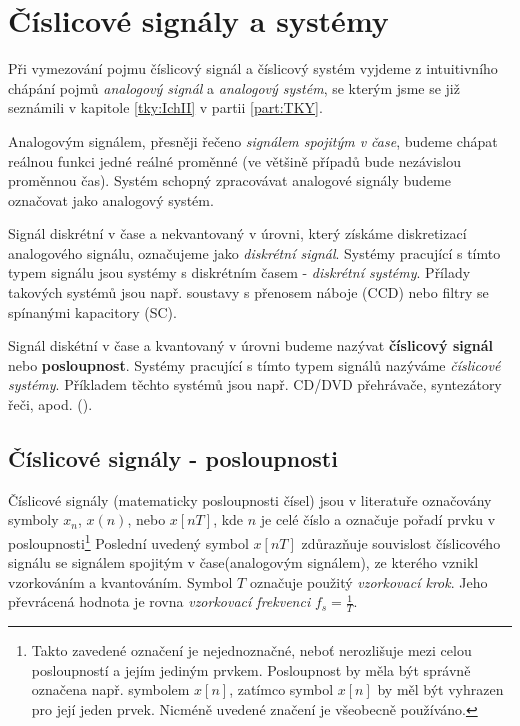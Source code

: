 \setchaptertoc
\chapter{Číslicové signály a systémy}\label{ces:IchapI}
    Při vymezování pojmu číslicový signál a číslicový systém vyjdeme z intuitivního chápání pojmů
    \emph{analogový signál} a \emph{analogový systém}, se kterým jsme se již seznámili v kapitole
    \ref{tky:IchII} v partii \ref{part:TKY}. 
    
    Analogovým signálem, přesněji řečeno \emph{signálem spojitým v čase}, budeme chápat reálnou
    funkci jedné reálné proměnné (ve většině případů bude nezávislou proměnnou čas). Systém schopný
    zpracovávat analogové signály budeme označovat jako analogový systém.

    Signál diskrétní v čase a nekvantovaný v úrovni, který získáme diskretizací analogového signálu,
    označujeme jako \emph{diskrétní signál}. Systémy pracující s tímto typem signálu jsou systémy s
    diskrétním časem - \emph{diskrétní systémy}. Přílady takových systémů jsou např. soustavy s
    přenosem náboje (CCD) nebo filtry se spínanými kapacitory (SC).

    Signál diskétní v čase a kvantovaný v úrovni budeme nazývat \textbf{číslicový signál} nebo
    \textbf{posloupnost}. Systémy pracující s tímto typem signálů nazýváme \emph{číslicové systémy}.
    Příkladem těchto systémů jsou např. CD/DVD přehrávače, syntezátory řeči, apod.
    (\cite[s.~1]{Davidek1996}).
    
  \section{Číslicové signály - posloupnosti}\label{ces:IchapIsecI}
    Číslicové signály (matematicky posloupnosti čísel) jsou v literatuře označovány symboly \(x_n\),
    \(x(n)\), nebo \(x[nT]\), kde \(n\) je celé číslo a označuje pořadí prvku v
    posloupnosti\footnote{Takto zavedené označení je nejednoznačné, neboť nerozlišuje mezi celou
    posloupností a jejím jediným prvkem. Posloupnost by měla být správně označena např. symbolem
    \(x[n]\), zatímco symbol \(x[n]\) by měl být vyhrazen pro její jeden prvek. Nicméně uvedené
    značení je všeobecně používáno.} Poslední uvedený symbol \(x[nT]\) zdůrazňuje souvislost
    číslicového signálu se signálem spojitým v čase(analogovým signálem), ze kterého vznikl
    vzorkováním a kvantováním. Symbol \(T\) označuje použitý \emph{vzorkovací krok}. Jeho převrácená
    hodnota je rovna \emph{vzorkovací frekvenci} \(f_s=\frac{1}{T}\).
    
